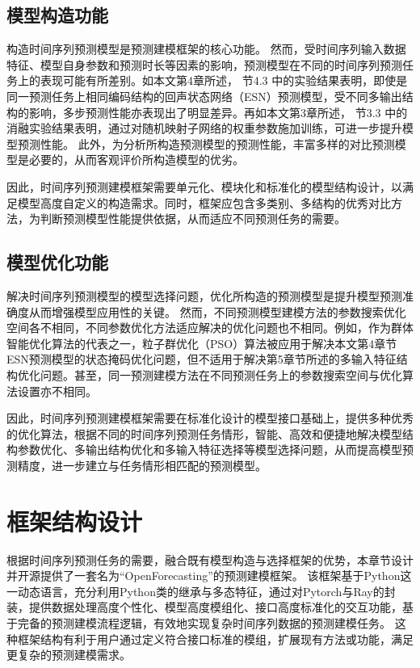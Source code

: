 \subsection{模型构造功能}
构造时间序列预测模型是预测建模框架的核心功能。
然而，受时间序列输入数据特征、模型自身参数和预测时长等因素的影响，预测模型在不同的时间序列预测任务上的表现可能有所差别。如本文第4章所述，
节4.3
中的实验结果表明，即使是同一预测任务上相同编码结构的回声状态网络（ESN）预测模型，受不同多输出结构的影响，多步预测性能亦表现出了明显差异。再如本文第3章所述，
节3.3
中的消融实验结果表明，通过对随机映射子网络的权重参数施加训练，可进一步提升模型预测性能。
此外，为分析所构造预测模型的预测性能，丰富多样的对比预测模型是必要的，从而客观评价所构造模型的优劣。

因此，时间序列预测建模框架需要单元化、模块化和标准化的模型结构设计，以满足模型高度自定义的构造需求。同时，框架应包含多类别、多结构的优秀对比方法，为判断预测模型性能提供依据，从而适应不同预测任务的需要。

\subsection{模型优化功能}

解决时间序列预测模型的模型选择问题，优化所构造的预测模型是提升模型预测准确度从而增强模型应用性的关键。
然而，不同预测模型建模方法的参数搜索优化空间各不相同，不同参数优化方法适应解决的优化问题也不相同。例如，作为群体智能优化算法的代表之一，粒子群优化（PSO）算法被应用于解决本文第4章节ESN预测模型的状态掩码优化问题，但不适用于解决第5章节所述的多输入特征结构优化问题。甚至，同一预测建模方法在不同预测任务上的参数搜索空间与优化算法设置亦不相同。

因此，时间序列预测建模框架需要在标准化设计的模型接口基础上，提供多种优秀的优化算法，根据不同的时间序列预测任务情形，智能、高效和便捷地解决模型结构参数优化、多输出结构优化和多输入特征选择等模型选择问题，从而提高模型预测精度，进一步建立与任务情形相匹配的预测模型。


\section{框架结构设计}
根据时间序列预测任务的需要，融合既有模型构造与选择框架的优势\cite{paszkePytorch2019,liawTune2018}，本章节设计并开源提供了一套名为“OpenForecasting”的预测建模框架。
该框架基于Python这一动态语言，充分利用Python类的继承与多态特征，通过对Pytorch与Ray的封装，提供数据处理高度个性化、模型高度模组化、接口高度标准化的交互功能，基于完备的预测建模流程逻辑，有效地实现复杂时间序列数据的预测建模任务。
这种框架结构有利于用户通过定义符合接口标准的模组，扩展现有方法或功能，满足更复杂的预测建模需求。


